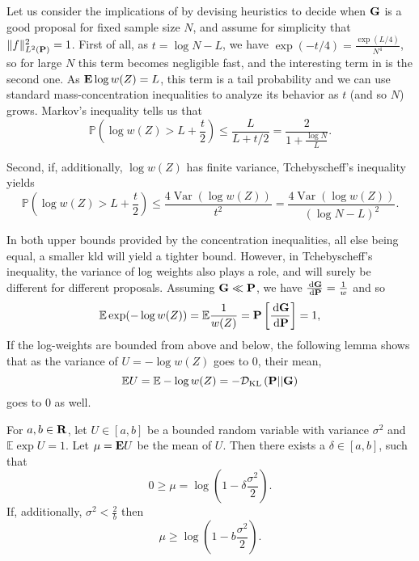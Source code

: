Let us consider the implications of  by devising heuristics to decide when $\G$ is a good proposal for fixed sample size $N$, and assume for simplicity that $ \lVert f \rVert^{2}_{L^{2}(\P)} = 1 $.
First of all, as $t = \log N - L$, we have $\exp(- t / 4) =  \frac{\exp (L / 4)}{N^{4}}$, so for large $N$ this term becomes negligible fast, and the interesting term in  is the second one. As $\E \log w(Z) = L$, this term is a tail probability and we can use standard mass-concentration inequalities to analyze its behavior as $t$ (and so $N$) grows. Markov's inequality tells us that 
$$
\mathbb P \left( \log w(Z) > L + \frac{t}{2} \right) \leq \frac{L}{L + t / 2} = \frac{2}{1 + \frac{\log N}{L}}.
$$

Second, if, additionally, $\log w(Z)$ has finite variance, Tchebyscheff's inequality yields 
$$
\mathbb P \left( \log w (Z) > L + \frac{t}{2} \right) \leq \frac{4\operatorname{Var} (\log w(Z))}{t^{2}} = \frac{4\operatorname{Var} (\log w(Z))}{\left( \log N - L \right)^2}.
$$

In both upper bounds provided by the concentration inequalities, all else being equal, a smaller \acrshort{kld} will yield a tighter bound. However, in Tchebyscheff's inequality, the variance of log weights also plays a role, and will surely be different for different proposals.
Assuming $\G \ll \P$, we have $ \frac{\d \G}{\d\P} = \frac{1}{w}$ and so 
$$\mathbb E \exp (- \log w(Z) ) = \mathbb E \frac{1}{w(Z)} = \P \left[\frac{\d \G}{\d\P}\right] = 1,$$
If the log-weights are bounded from above and below, the following lemma shows that as the variance of $U = -\log w(Z)$ goes to $0$, their mean,
$$
\mathbb E U = \mathbb E - \log w(Z) = -\Dkl{\P}{\G}
$$
goes to $0$ as well.
\begin{lemma}
    \label{lem:bounded-log-variance}
    For $a,b \in \R$, let $U \in [a,b]$ be a bounded random variable with variance $\sigma^{2}$ and $\mathbb E \exp U = 1$. Let $\mu = \E U$ be the mean of $U$. Then there exists a $\delta \in [a,b]$, such that 
    $$
    0 \geq \mu = \log \left( 1 - \delta \frac{\sigma^{2}}{2} \right).
    $$
    If, additionally, $\sigma^{2} < \frac{2}{b}$ then 
    $$
    \mu \geq \log \left( 1 - b \frac{\sigma^{2}}{2} \right).
    $$
\end{lemma}

